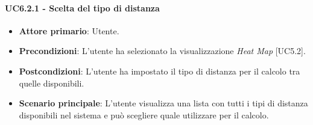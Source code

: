 \paragraph{UC6.2.1 - Scelta del tipo di distanza}
\begin{itemize}
	\item \textbf{Attore primario}: Utente.
	\item \textbf{Precondizioni}: L'utente ha selezionato la visualizzazione \textit{Heat Map} [UC5.2].
	\item \textbf{Postcondizioni}: L'utente ha impostato il tipo di distanza per il calcolo tra quelle disponibili.
	
	\item \textbf{Scenario principale}: L'utente visualizza una lista con tutti i tipi di distanza disponibili nel sistema e può scegliere quale utilizzare per il calcolo.
\end{itemize}